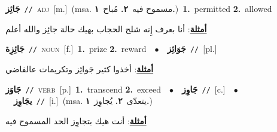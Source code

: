 \documentclass[10pt,a4paper,twoside]{article} %
\begin{document}
\begin{multicols}{2}
{\setlength\topsep{0pt}\textbf{\foreignlanguage{arabic}{جَائِز}}\ {\color{gray}\texttt{//}\color{black}}\ \textsc{adj}\ [m.]\ \color{gray}(msa. \foreignlanguage{arabic}{مسموح فيه}~\foreignlanguage{arabic}{\textbf{٢.}}  \foreignlanguage{arabic}{مُباح}~\foreignlanguage{arabic}{\textbf{١.}})\color{black}\ \textbf{1.}~permitted  \textbf{2.}~allowed\  \begin{flushright}\color{gray}\foreignlanguage{arabic}{\textbf{\underline{\foreignlanguage{arabic}{أمثلة}}}: أنا بعرف إِنه شلح الحجاب بهيك حالة جائِز والله أعلم}\end{flushright}\color{black}} \vspace{2mm}

{\setlength\topsep{0pt}\textbf{\foreignlanguage{arabic}{جَائِزِة}}\ {\color{gray}\texttt{//}\color{black}}\ \textsc{noun}\ [f.]\ \textbf{1.}~prize  \textbf{2.}~reward\ \ $\bullet$\ \ \setlength\topsep{0pt}\textbf{\foreignlanguage{arabic}{جَوَائِز}}\ {\color{gray}\texttt{//}\color{black}}\ [pl.]\  \begin{flushright}\color{gray}\foreignlanguage{arabic}{\textbf{\underline{\foreignlanguage{arabic}{أمثلة}}}: أخذوا كثير جَوائِز وتكريمات عالفاضي}\end{flushright}\color{black}} \vspace{2mm}

{\setlength\topsep{0pt}\textbf{\foreignlanguage{arabic}{جَاوَز}}\ {\color{gray}\texttt{//}\color{black}}\ \textsc{verb}\ [p.]\ \textbf{1.}~transcend  \textbf{2.}~exceed\ \ $\bullet$\ \ \setlength\topsep{0pt}\textbf{\foreignlanguage{arabic}{جَاوِز}}\ {\color{gray}\texttt{//}\color{black}}\ [c.]\ \ $\bullet$\ \ \setlength\topsep{0pt}\textbf{\foreignlanguage{arabic}{يجَاوِز}}\ {\color{gray}\texttt{//}\color{black}}\ [i.]\ \color{gray}(msa. \foreignlanguage{arabic}{يتعدّى}~\foreignlanguage{arabic}{\textbf{٢.}}  \foreignlanguage{arabic}{يُجاوِز}~\foreignlanguage{arabic}{\textbf{١.}})\color{black}\  \begin{flushright}\color{gray}\foreignlanguage{arabic}{\textbf{\underline{\foreignlanguage{arabic}{أمثلة}}}: أنت هيك بتجاوِز الحد المسموح فيه}\end{flushright}\color{black}} \vspace{2mm}


\end{multicols}
\end{document}
